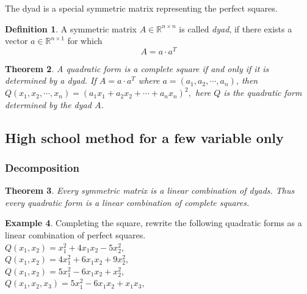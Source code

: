 \documentclass[aspectratio=169,notheorems]{corvinusmetropolis}
\newtheorem{theorem}{Theorem}
\theoremstyle{definition}
\newtheorem{definition}[theorem]{Definition}
\newtheorem{example}[theorem]{Example}
\begin{document}
\begin{frame}
    The dyad is a special symmetric matrix representing the perfect squares.
    \begin{definition}
        A symmetric matrix $A\in\mathbb{R}^{n\times n}$ is called \alert{\emph{dyad}}, 
        if there exists a vector
        $a\in\mathbb{R}^{n\times 1}$ for which
        \[
            A=a\cdot a^T
        \]
    \end{definition}
    \begin{theorem}
        A quadratic form is a complete square if and only if it is determined by a dyad.
        If $A=a\cdot a^T$ where $a=\left( a_1,a_2,\cdots,a_n \right)$, then
          \(
             Q\left( x_1,x_2,\cdots,x_n \right)=
              \left( a_1x_1+a_2x_2+\cdots+a_nx_n \right)^2,
          \)
        here $Q$ is the quadratic form determined by the dyad $A$.
    \end{theorem}
\end{frame}

\subsection{High school method for a few variable only}

\begin{frame}
    \frametitle{Decomposition}
    \begin{theorem}
        Every symmetric matrix is a linear combination of dyads. Thus
        every quadratic form is a linear combination of complete squares.
    \end{theorem}
    \begin{example}
        Completing the square, rewrite the following quadratic forms as a linear combination of perfect squares.\\
        $Q\left( x_1,x_2 \right)=x_1^2+4x_1x_2-5x_2^2,$\\
        $Q\left( x_1,x_2 \right)=4x_1^2+6x_1x_2+9x_2^2,$\\
        $Q\left( x_1,x_2 \right)=5x_1^2-6x_1x_2+x_2^2,$\\
        $Q\left( x_1,x_2,x_3 \right)=5x_1^2-6x_1x_2+x_1x_3,$\\
    \end{example}
\end{frame}
\end{document}
